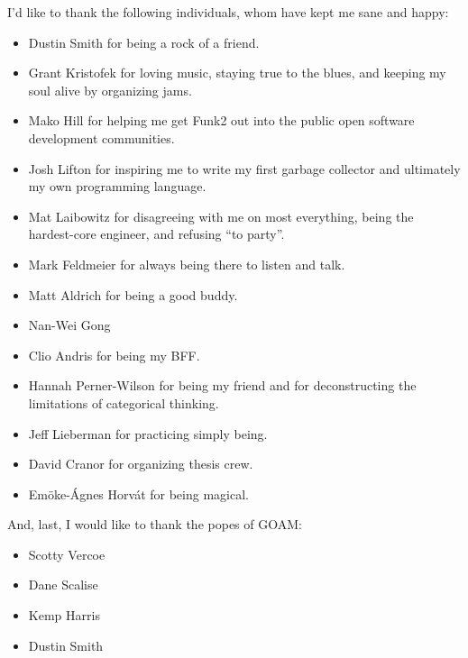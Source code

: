 \vspace{5mm}

I'd like to thank the following individuals, whom have kept me sane and happy:
\begin{itemize}
\item{Dustin Smith for being a rock of a friend.}
\item{Grant Kristofek for loving music, staying true to the blues, and keeping my soul alive by organizing jams.}
\item{Mako Hill for helping me get Funk2 out into the public open software development communities.}
\item{Josh Lifton for inspiring me to write my first garbage collector and ultimately my own programming language.}
\item{Mat Laibowitz for disagreeing with me on most everything, being the hardest-core engineer, and refusing ``to party''.}
\item{Mark Feldmeier for always being there to listen and talk.}
\item{Matt Aldrich for being a good buddy.}
\item{Nan-Wei Gong}
\item{Clio Andris for being my BFF.}
\item{Hannah Perner-Wilson for being my friend and for deconstructing the limitations of categorical thinking.}
\item{Jeff Lieberman for practicing simply being.}
\item{David Cranor for organizing thesis crew.}
\item{Em\"{o}ke-\'{A}gnes Horv\'{a}t for being magical.}
\end{itemize}

\vspace{5mm}

And, last, I would like to thank the popes of GOAM:
\begin{itemize}
\item{Scotty Vercoe}
\item{Dane Scalise}
\item{Kemp Harris}
\item{Dustin Smith}
\end{itemize}

\endgroup

